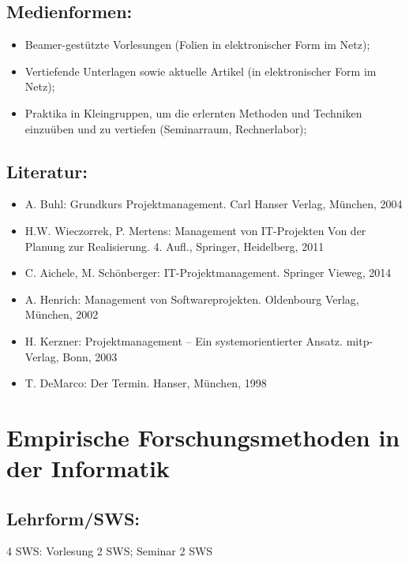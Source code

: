\section*{Medienformen:}\label{medienformen-9}

\begin{itemize}
\item
  Beamer-gestützte Vorlesungen (Folien in elektronischer Form im Netz);
\item
  Vertiefende Unterlagen sowie aktuelle Artikel (in elektronischer Form
  im Netz);
\item
  Praktika in Kleingruppen, um die erlernten Methoden und Techniken
  einzuüben und zu vertiefen (Seminarraum, Rechnerlabor);
\end{itemize}

\section*{Literatur:}\label{literatur-16}

\begin{itemize}
\item
  A. Buhl: Grundkurs Projektmanagement. Carl Hanser Verlag, München,
  2004
\item
  H.W. Wieczorrek, P. Mertens: Management von IT-Projekten Von der
  Planung zur Realisierung. 4. Aufl., Springer, Heidelberg, 2011
\item
  C. Aichele, M. Schönberger: IT-Projektmanagement. Springer Vieweg,
  2014
\item
  A. Henrich: Management von Softwareprojekten. Oldenbourg Verlag,
  München, 2002
\item
  H. Kerzner: Projektmanagement -- Ein systemorientierter Ansatz.
  mitp-Verlag, Bonn, 2003
\item
  T. DeMarco: Der Termin. Hanser, München, 1998
\end{itemize}

\chapter{Empirische Forschungsmethoden in der
Informatik}\label{empirische-forschungsmethoden-in-der-informatik}

\section*{Lehrform/SWS:}\label{lehrformsws-17}

4 SWS: Vorlesung 2 SWS; Seminar 2 SWS

